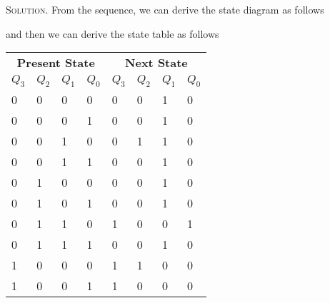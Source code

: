 \documentclass[12pt, a4paper, oneside]{article}
\newenvironment{solution}{\par\noindent\textsc{Solution. }}{\\\par}
\begin{document}
\begin{solution}
    From the sequence, we can derive the state diagram as follows
    \begin{figure}[!htbp]
        \centering
    \end{figure}
    \newline and then we can derive the state table as follows
    \begin{table}[!htbp]
        \centering
    \begin{tabular}{p{}<{\centering}p{}<{\centering}p{}<{\centering}p{}<{\centering}
        p{}<{\centering}p{}<{\centering}p{}<{\centering}p{}<{\centering}}
        \toprule
        \multicolumn{4}{c}{\textbf{Present State}} & \multicolumn{4}{c}{\textbf{Next State}} \\
        \cmidrule(lr){1-4}\cmidrule(lr){5-8}
        $Q_3$ & $Q_2$ & $Q_1$ & $Q_0$ & $Q_3$ & $Q_2$ & $Q_1$ & $Q_0$ \\
        \midrule
        0 & 0 & 0 & 0 & 0 & 0 & 1 & 0 \\
        0 & 0 & 0 & 1 & 0 & 0 & 1 & 0 \\
        0 & 0 & 1 & 0 & 0 & 1 & 1 & 0 \\
        0 & 0 & 1 & 1 & 0 & 0 & 1 & 0 \\
        0 & 1 & 0 & 0 & 0 & 0 & 1 & 0 \\
        0 & 1 & 0 & 1 & 0 & 0 & 1 & 0 \\
        0 & 1 & 1 & 0 & 1 & 0 & 0 & 1 \\
        0 & 1 & 1 & 1 & 0 & 0 & 1 & 0 \\
        1 & 0 & 0 & 0 & 1 & 1 & 0 & 0 \\
        1 & 0 & 0 & 1 & 1 & 0 & 0 & 0 \\

\end{tabular}
\end{table}
\end{solution}
\end{document}
